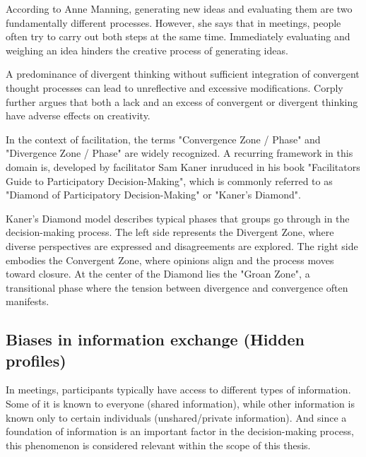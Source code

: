 According to Anne Manning, generating new ideas and evaluating them are two fundamentally different
processes. However, she says that in meetings, people often try to carry out both steps at the same time.
\cite[min 02:30]{professional&executivedevelopment-harvarddceConvergentVsDivergent2024}
Immediately evaluating and weighing an idea hinders the creative process of generating ideas.

A predominance of divergent thinking without sufficient integration of convergent thought processes can lead
to unreflective and excessive modifications. Corply further argues that both a lack and an excess of
convergent or divergent thinking have adverse effects on creativity. \cite{cropleyPraiseConvergentThinking2006}

In the context of facilitation, the terms "Convergence Zone / Phase" and "Divergence Zone / Phase" are
widely recognized. A recurring framework in this domain is, developed by facilitator
Sam Kaner inruduced in his book "Facilitators Guide to Participatory Decision-Making", which is commonly
referred to as "Diamond of Participatory Decision-Making" or "Kaner’s Diamond".
\cite{kanerFacilitatorsGuideParticipatory2014}

Kaner’s Diamond model describes typical phases that groups go through in the decision-making process. The left
side represents the Divergent Zone, where diverse perspectives are expressed and disagreements are explored.
The right side embodies the Convergent Zone, where opinions align and the process moves toward closure. At
the center of the Diamond lies the "Groan Zone", a transitional phase where the tension between divergence
and convergence often manifests. \cite[p. 32f.]{aj&smartFacilitationFundamentalsWorkbook}

\subsection{Biases in information exchange (Hidden profiles)}
\label{sec:hidden-profiles}

In meetings, participants typically have access to different types of information. Some of it is known to everyone
(shared information),
while other information is known only to certain individuals (unshared/private information).
And since a foundation of information is an important factor in the decision-making process, this phenomenon
is considered relevant within the scope of this thesis.

